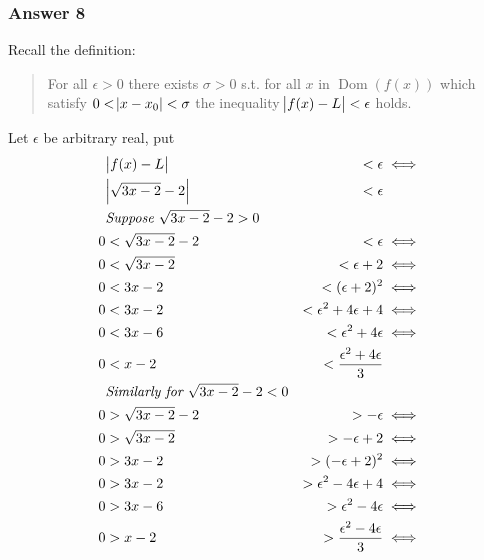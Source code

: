 \documentclass[11pt]{article}
\DeclareMathOperator{\Dom}{Dom}
\begin{document}
\subsubsection{Answer 8}
\label{sec-1-3-1}
Recall the definition:
\begin{quote}
For all $\epsilon > 0$ there exists $\sigma > 0$ s.t. for all $x$ in
$\Dom(f(x))$ which satisfy $0 < \abs{x - x_0} < \sigma$ the inequality
$\abs{f(x) - L} < \epsilon$ holds.
\end{quote}

Let $\epsilon$ be arbitrary real, put
\begin{equation*}
  \begin{aligned}
      &\abs{f(x) - L}          &< \epsilon                         &\iff \\
      &\abs{\sqrt{3x - 2} - 2} &< \epsilon                               \\
      &\textit{Suppose $\sqrt{3x - 2} - 2 > 0$}                          \\
    0 &< \sqrt{3x - 2} - 2     &< \epsilon                         &\iff \\
    0 &< \sqrt{3x - 2}         &< \epsilon + 2                     &\iff \\
    0 &< 3x - 2                &< (\epsilon + 2)^2                 &\iff \\
    0 &< 3x - 2                &< \epsilon^2 + 4\epsilon + 4       &\iff \\
    0 &< 3x - 6                &< \epsilon^2 + 4\epsilon           &\iff \\
    0 &< x - 2                 &< \frac{\epsilon^2 + 4\epsilon}{3}       \\
      &\textit{Similarly for $\sqrt{3x - 2} - 2 < 0$}                    \\
    0 &> \sqrt{3x - 2} - 2     &> -\epsilon                        &\iff \\
    0 &> \sqrt{3x - 2}         &> -\epsilon + 2                    &\iff \\
    0 &> 3x - 2                &> (-\epsilon + 2)^2                &\iff \\
    0 &> 3x - 2                &> \epsilon^2 - 4\epsilon + 4       &\iff \\
    0 &> 3x - 6                &> \epsilon^2 - 4\epsilon           &\iff \\
    0 &> x - 2                 &> \frac{\epsilon^2 - 4\epsilon}{3} &\iff \\
  \end{aligned}
\end{equation*}
\end{document}
